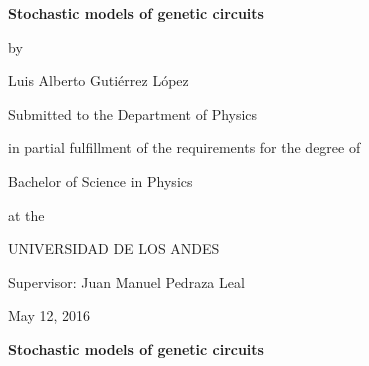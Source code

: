 \documentclass[12pt,letterpaper,twoside,openright]{report}
\begin{document}
\begin{titlepage}
        \vspace*{1.5cm}
	\centering \large
	{\Large \bf Stochastic models of genetic circuits\par}
        \vspace{0.3cm}
        {by\par}
        \vspace{0.3cm}
	{\Large Luis Alberto Guti\'errez L\'opez \par}
        \vspace{2.2cm}
        {
	{Submitted to the Department of Physics\par}
        {in partial fulfillment of the requirements for the degree of \par}}
        \vspace{.25cm}
	{Bachelor of Science in Physics\par}
        \vspace{.25cm}
        {at the\par}
        \vspace{.25cm}
        {UNIVERSIDAD DE LOS ANDES\par}
        \vspace{2.2cm}
        {Supervisor: Juan Manuel Pedraza Leal\par}
        \vspace{2.8cm}
        {May 12, 2016}

        
        
        
        

	\vfill
\end{titlepage}

\cleardoublepage

\begin{center}
{\large \bf Stochastic models of genetic circuits} \\
\end{center}
\par
\end{document}
